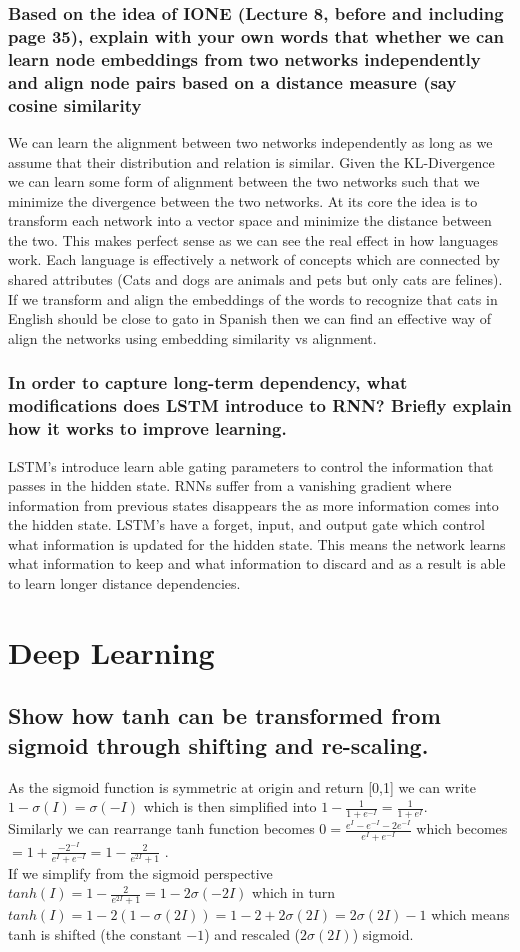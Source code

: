 \documentclass[11pt]{article}
\begin{document}
\subsubsection{Based on the idea of IONE (Lecture 8, before and including page 35), explain with your own words that whether we can learn node embeddings from two networks independently and align node pairs based on a distance measure (say cosine similarity}
We can learn the alignment between two networks independently as long as we assume that their distribution and relation is similar. Given the KL-Divergence we can learn some form of alignment between the two networks such that we minimize the divergence between the two networks. At its core the idea is to transform each network into a vector space and minimize the distance between the two. This makes perfect sense as we can see the real effect in how languages work. Each language is effectively a network of concepts which are connected by shared attributes (Cats and dogs are animals and pets but only cats are felines). If we transform and align the embeddings of the words to recognize that cats in English should be close to gato in Spanish then we can find an effective way of align the networks using embedding similarity vs alignment.
\subsubsection{In order to capture long-term dependency, what modifications does LSTM introduce to RNN? Briefly explain how it works to improve learning.}
LSTM's introduce learn able gating parameters to control the information that passes in the hidden state. RNNs suffer from a vanishing gradient where information from previous states disappears the as more information comes into the hidden state. LSTM's have a forget, input, and output gate which control what information is updated for the hidden state. This means the network learns what information to keep and what information to discard and as a result is able to learn longer distance dependencies. 
\section{Deep Learning}
\subsection{Show how tanh can be transformed from sigmoid through shifting and re-scaling. }
As the sigmoid function is symmetric at origin and return [0,1] we can write $1 - \sigma(I) = \sigma(-I)$ which is then simplified into $1- \frac{1}{1+e^{-I}} = \frac{1}{1+e^{I}}$. \\
Similarly we can rearrange tanh function becomes $0 = \frac{e^I-e^{-I} -2e^{-I}}{e^I + e^{-I}}$ which becomes $= 1+ \frac{-2^{-I}}{e^I+e^{-I}} = 1 - \frac{2}{e^{2I}+1}$ .\\
If we simplify from the sigmoid perspective $tanh(I) = 1 - \frac{2}{e^{2I}+1} = 1-2\sigma(-2I)$ which in turn  $tanh(I)= 1-2(1-\sigma(2I)) = 1-2 + 2 \sigma (2I) = 2 \sigma (2I) -1$ 
which means tanh is shifted (the constant $-1$) and rescaled ($2 \sigma (2I)$) sigmoid. 
\end{document}
